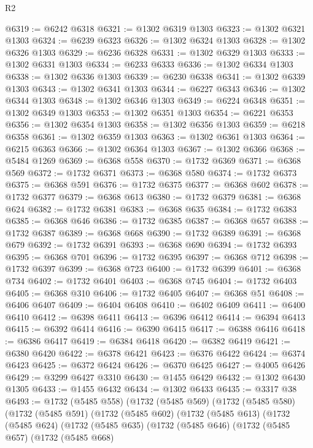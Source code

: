 \begin{lexlean}{R2}
\begin{coremodule}
@6319 := @6242 @6318
@6321 := @1302 @6319 @1303
@6323 := @1302 @6321 @1303
@6324 := @6239 @6323
@6326 := @1302 @6324 @1303
@6328 := @1302 @6326 @1303
@6329 := @6236 @6328
@6331 := @1302 @6329 @1303
@6333 := @1302 @6331 @1303
@6334 := @6233 @6333
@6336 := @1302 @6334 @1303
@6338 := @1302 @6336 @1303
@6339 := @6230 @6338
@6341 := @1302 @6339 @1303
@6343 := @1302 @6341 @1303
@6344 := @6227 @6343
@6346 := @1302 @6344 @1303
@6348 := @1302 @6346 @1303
@6349 := @6224 @6348
@6351 := @1302 @6349 @1303
@6353 := @1302 @6351 @1303
@6354 := @6221 @6353
@6356 := @1302 @6354 @1303
@6358 := @1302 @6356 @1303
@6359 := @6218 @6358
@6361 := @1302 @6359 @1303
@6363 := @1302 @6361 @1303
@6364 := @6215 @6363
@6366 := @1302 @6364 @1303
@6367 := @1302 @6366
@6368 := @5484 @1269
@6369 := @6368 @558
@6370 := @1732 @6369
@6371 := @6368 @569
@6372 := @1732 @6371
@6373 := @6368 @580
@6374 := @1732 @6373
@6375 := @6368 @591
@6376 := @1732 @6375
@6377 := @6368 @602
@6378 := @1732 @6377
@6379 := @6368 @613
@6380 := @1732 @6379
@6381 := @6368 @624
@6382 := @1732 @6381
@6383 := @6368 @635
@6384 := @1732 @6383
@6385 := @6368 @646
@6386 := @1732 @6385
@6387 := @6368 @657
@6388 := @1732 @6387
@6389 := @6368 @668
@6390 := @1732 @6389
@6391 := @6368 @679
@6392 := @1732 @6391
@6393 := @6368 @690
@6394 := @1732 @6393
@6395 := @6368 @701
@6396 := @1732 @6395
@6397 := @6368 @712
@6398 := @1732 @6397
@6399 := @6368 @723
@6400 := @1732 @6399
@6401 := @6368 @734
@6402 := @1732 @6401
@6403 := @6368 @745
@6404 := @1732 @6403
@6405 := @6368 @310
@6406 := @1732 @6405
@6407 := @6368 @51
@6408 := @6406 @6407
@6409 := @6404 @6408
@6410 := @6402 @6409
@6411 := @6400 @6410
@6412 := @6398 @6411
@6413 := @6396 @6412
@6414 := @6394 @6413
@6415 := @6392 @6414
@6416 := @6390 @6415
@6417 := @6388 @6416
@6418 := @6386 @6417
@6419 := @6384 @6418
@6420 := @6382 @6419
@6421 := @6380 @6420
@6422 := @6378 @6421
@6423 := @6376 @6422
@6424 := @6374 @6423
@6425 := @6372 @6424
@6426 := @6370 @6425
@6427 := @4005 @6426
@6429 := @3299 @6427 @3310
@6430 := @1455 @6429
@6432 := @1302 @6430 @1305
@6433 := @1455 @6432
@6434 := @1302 @6433
@6435 := @3317 @38
@6493 := @1732
    (@5485 @558)
    (@1732
      (@5485 @569)
      (@1732
        (@5485 @580)
        (@1732
          (@5485 @591)
          (@1732
            (@5485 @602)
            (@1732
              (@5485 @613)
              (@1732
                (@5485 @624)
                (@1732
                  (@5485 @635)
                  (@1732
                    (@5485 @646)
                    (@1732
                      (@5485 @657)
                      (@1732
                        (@5485 @668)

\end{coremodule}
\end{lexlean}
